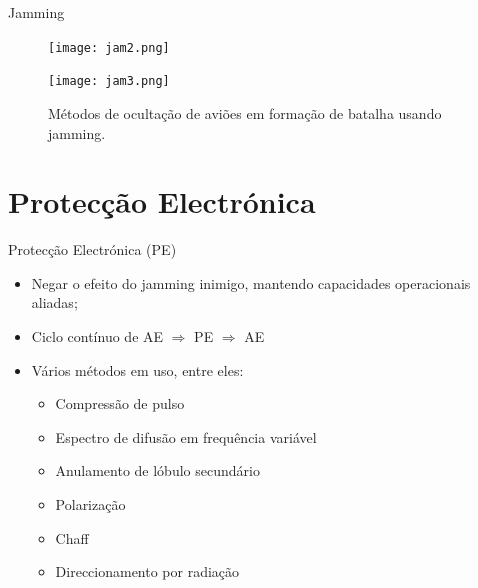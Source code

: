 \documentclass[portuguese,10pt]{beamer}
\begin{document}
\begin{frame}{Jamming}
    \begin{figure}[ht]
        \begin{minipage}[c]{0.49\linewidth}
            \centering
            \texttt{[image: jam2.png]}
            \caption{Métodos de ocultação de aviões (helicópteros) e outros alvos de áreas fixas usando jamming}
            \label{jam2}
        \end{minipage}
        \hspace{\fill}
        \begin{minipage}[c]{0.49\linewidth}
            \centering
            \texttt{[image: jam3.png]}
            \caption{Métodos de ocultação de aviões em formação de batalha usando jamming.}
            \label{jam3}
        \end{minipage}
    \end{figure}
\end{frame}



\section{Protecção Electrónica}

\begin{frame}{Protecção Electrónica (PE)}
    \begin{itemize}
        \item Negar o efeito do jamming inimigo, mantendo capacidades operacionais aliadas;
        \vspace*{3mm}
        \item Ciclo contínuo de AE $\Rightarrow$ PE $\Rightarrow$ AE
        \vspace*{3mm}
        \item Vários métodos em uso, entre eles:
        \begin{itemize}
            \item Compressão de pulso
            \item Espectro de difusão em frequência variável
            \item Anulamento de lóbulo secundário
            \item Polarização
            \item Chaff
            \item Direccionamento por radiação
        \end{itemize}
    \end{itemize}
\end{frame}
\end{document}

